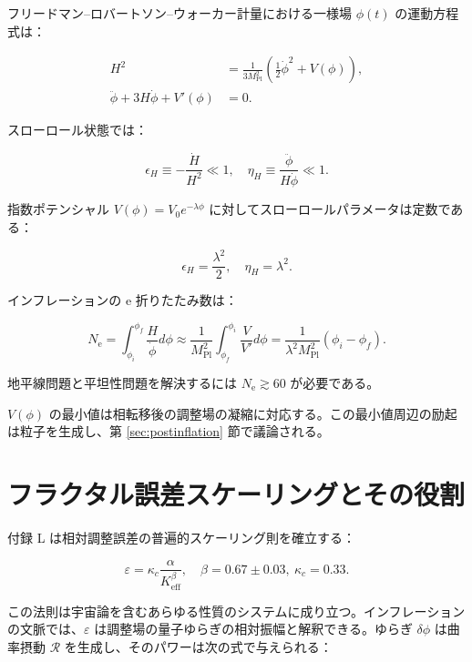 \documentclass[11pt,a4paper]{article}
\theoremstyle{remark}
\newcommand{\Keff}{K_{\mathrm{eff}}}
\newcommand{\kappac}{\kappa_c}
\newcommand{\eps}{\varepsilon}
\newcommand{\Mpl}{M_{\mathrm{Pl}}}
\newcommand{\ninf}{N_{\mathrm{e}}}
\begin{document}
	フリードマン–ロバートソン–ウォーカー計量における一様場 $\phi(t)$ の運動方程式は：
	
	\begin{align}
		H^2 &= \frac{1}{3\Mpl^2} \left( \frac{1}{2}\dot{\phi}^2 + V(\phi) \right), \label{eq:friedman1} \\
		\ddot{\phi} + 3H\dot{\phi} + V'(\phi) &= 0. \label{eq:field}
	\end{align}
	
	スローロール状態では：
	
	\begin{equation}
		\epsilon_H \equiv -\frac{\dot{H}}{H^2} \ll 1, \quad \eta_H \equiv \frac{\ddot{\phi}}{H\dot{\phi}} \ll 1.
	\end{equation}
	
	指数ポテンシャル $V(\phi) = V_0 e^{-\lambda \phi}$ に対してスローロールパラメータは定数である：
	
	\begin{equation}
		\epsilon_H = \frac{\lambda^2}{2}, \quad \eta_H = \lambda^2.
		\label{eq:slowroll}
	\end{equation}
	
	インフレーションの e 折りたたみ数は：
	
	\begin{equation}
		\ninf = \int_{\phi_i}^{\phi_f} \frac{H}{\dot{\phi}} d\phi \approx \frac{1}{\Mpl^2} \int_{\phi_f}^{\phi_i} \frac{V}{V'} d\phi = \frac{1}{\lambda^2 \Mpl^2} (\phi_i - \phi_f).
	\end{equation}
	
	地平線問題と平坦性問題を解決するには $\ninf \gtrsim 60$ が必要である。
	
	$V(\phi)$ の最小値は相転移後の調整場の凝縮に対応する。この最小値周辺の励起は粒子を生成し、第 \ref{sec:postinflation} 節で議論される。
	
	\section{フラクタル誤差スケーリングとその役割}
	\label{sec:fractal}
	
	付録 L は相対調整誤差の普遍的スケーリング則を確立する：
	
	\begin{equation}
		\eps = \kappac \frac{\alpha}{\Keff^{\beta}}, \quad \beta = 0.67 \pm 0.03,\ \kappac = 0.33.
		\label{eq:error-scaling}
	\end{equation}
	
	この法則は宇宙論を含むあらゆる性質のシステムに成り立つ。インフレーションの文脈では、$\eps$ は調整場の量子ゆらぎの相対振幅と解釈できる。ゆらぎ $\delta \phi$ は曲率摂動 $\mathcal{R}$ を生成し、そのパワーは次の式で与えられる：
	
\end{document}
